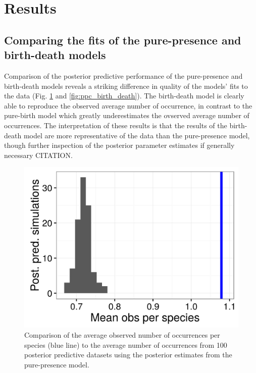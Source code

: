 \documentclass[12pt,letterpaper]{article}
\begin{document}
\section*{Results}

\subsection*{Comparing the fits of the pure-presence and birth-death models}


Comparison of the posterior predictive performance of the pure-presence and birth-death models reveals a striking difference in quality of the models' fits to the data (Fig. \ref{fig:ppc_pure_presence} and \ref{fig:ppc_birth_death}). The birth-death model is clearly able to reproduce the observed average number of occurrence, in contrast to the pure-birth model which greatly underestimates the ovserved average number of occurrences. The interpretation of these results is that the results of the birth-death model are more representative of the data than the pure-presence model, though further inspection of the posterior parameter estimates if generally necessary CITATION.

\begin{figure}[ht]
  \centering
  \includegraphics[width=\textwidth,height=0.4\textheight,keepaspectratio=true]{figure/pred_occ}
  \caption[Posterior predictive check for pure-presence model]{Comparison of the average observed number of occurrences per species (blue line) to the average number of occurrences from 100 posterior predictive datasets using the posterior estimates from the pure-presence model.}
  \label{fig:ppc_pure_presence}
\end{figure}
\end{document}
